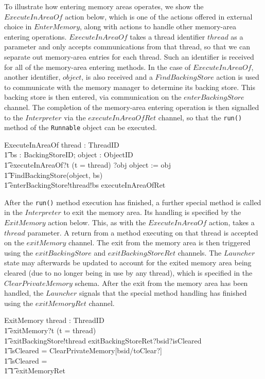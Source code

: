 To illustrate how entering memory areas operates, we show the
$ExecuteInAreaOf$ action below, which is one of the actions offered in
external choice in $EnterMemory$, along with actions to handle other
memory-area entering operations.
$ExecuteInAreaOf$ takes a thread identifier $thread$ as a parameter
and only accepts communications from that thread, so that we can
separate out memory-area entries for each thread.
Such an identifier is received for all of the memory-area entering
methods.
In the case of $ExecuteInAreaOf$, another identifier, $object$, is
also received and a $FindBackingStore$ action is used to communicate
with the memory manager to determine its backing store.
This backing store is then entered, via communication on the
$enterBackingStore$ channel.
The completion of the memory-area entering operation is then signalled
to the $Interpreter$ via the $executeInAreaOfRet$ channel, so that the
\texttt{run()} method of the \texttt{Runnable} object can be executed.
\begin{circusaction}
  ExecuteInAreaOf \circdef \circval thread : ThreadID \circspot \\
  \t1 \circvar bs : BackingStoreID; object : ObjectID \circspot \\
  \t1 executeInAreaOf?t \prefixcolon (t = thread) ?obj \then object := obj \circseq \\
  \t1 FindBackingStore(object, bs) \circseq \\
  \t1 enterBackingStore!thread!bs \then executeInAreaOfRet \then \Skip
\end{circusaction}

After the \texttt{run()} method execution has finished, a further
special method is called in the $Interpreter$ to exit the memory area. 
Its handling is specified by the $ExitMemory$ action below.
This, as with the $ExecuteInAreaOf$ action, takes a $thread$
parameter.
A return from a method executing on that thread is accepted on the
$exitMemory$ channel.
The exit from the memory area is then triggered using the
$exitBackingStore$ and $exitBackingStoreRet$ channels.
The $Launcher$ state may afterwards be updated to account for the
exited memory area being cleared (due to no longer being in use by any
thread), which is specified in the $ClearPrivateMemory$ schema.
After the exit from the memory area has been handled, the $Launcher$
signals that the special method handling has finished using the
$exitMemoryRet$ channel.
\begin{circusaction}
  ExitMemory \circdef \circval thread : ThreadID \circspot \\
  \t1 exitMemory?t \prefixcolon (t = thread) \\
  \t1 {} \then exitBackingStore!thread \then exitBackingStoreRet?bsid?isCleared \then {} \\
  \t1 \circif isCleared = \true \circthen \lschexpract ClearPrivateMemory[bsid/toClear?] \rschexpract \\
  \t1 {} \circelse isCleared = \false \circthen \Skip \\
  \t1 \circfi \circseq
  \t1 exitMemoryRet \then \Skip
\end{circusaction}

